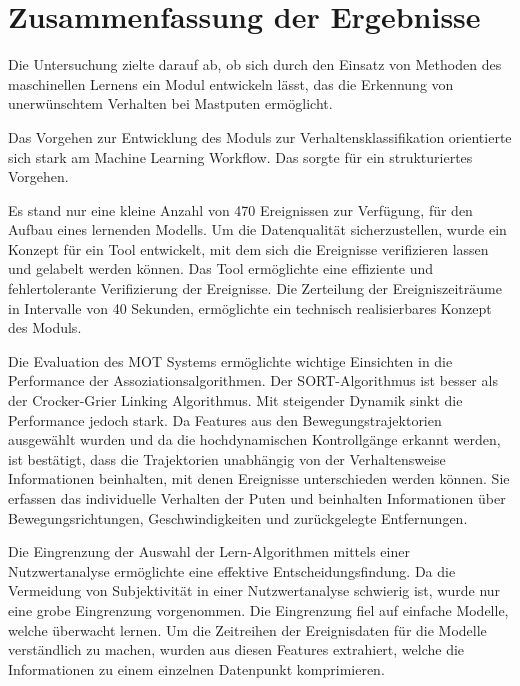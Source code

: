 \section{Zusammenfassung der Ergebnisse} \label{sec:Zusammenfassung}
Die Untersuchung zielte darauf ab, ob sich durch den Einsatz von Methoden des maschinellen Lernens ein Modul entwickeln lässt, das die Erkennung von unerwünschtem Verhalten bei Mastputen ermöglicht.

Das Vorgehen zur Entwicklung des Moduls zur Verhaltensklassifikation orientierte sich stark am Machine Learning Workflow. Das sorgte für ein strukturiertes Vorgehen. \par

Es stand nur eine kleine Anzahl von 470 Ereignissen zur Verfügung, für den Aufbau eines lernenden Modells. Um die Datenqualität sicherzustellen, wurde ein Konzept für ein Tool entwickelt, mit dem sich die Ereignisse verifizieren lassen und gelabelt werden können. Das Tool ermöglichte eine effiziente und fehlertolerante Verifizierung der Ereignisse. Die Zerteilung der Ereigniszeiträume in Intervalle von 40 Sekunden, ermöglichte ein technisch realisierbares Konzept des Moduls.\par

Die Evaluation des MOT Systems ermöglichte wichtige Einsichten in die Performance der Assoziationsalgorithmen. Der SORT-Algorithmus ist besser als der Crocker-Grier Linking Algorithmus. Mit steigender Dynamik sinkt die Performance jedoch stark. Da Features aus den Bewegungstrajektorien ausgewählt wurden und da die hochdynamischen Kontrollgänge erkannt werden, ist bestätigt, dass die Trajektorien unabhängig von der Verhaltensweise Informationen beinhalten, mit denen Ereignisse unterschieden werden können. Sie erfassen das individuelle Verhalten der Puten und beinhalten Informationen über Bewegungsrichtungen, Geschwindigkeiten und zurückgelegte Entfernungen.  \par

Die Eingrenzung der Auswahl der Lern-Algorithmen mittels einer Nutzwertanalyse ermöglichte eine effektive Entscheidungsfindung. Da die Vermeidung von Subjektivität in einer Nutzwertanalyse schwierig ist, wurde nur eine grobe Eingrenzung vorgenommen. Die Eingrenzung fiel auf einfache Modelle, welche überwacht lernen. Um die Zeitreihen der Ereignisdaten für die Modelle verständlich zu machen, wurden aus diesen Features extrahiert, welche die Informationen zu einem einzelnen Datenpunkt komprimieren. \par

